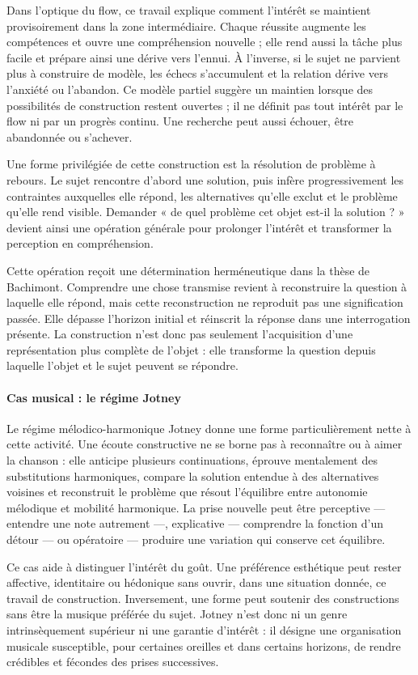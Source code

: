 \documentclass[10pt,a4paper]{article}
\begin{document}
Dans l'optique du flow, ce travail explique comment l'intérêt se maintient provisoirement dans la zone intermédiaire. Chaque réussite augmente les compétences et ouvre une compréhension nouvelle ; elle rend aussi la tâche plus facile et prépare ainsi une dérive vers l'ennui. À l'inverse, si le sujet ne parvient plus à construire de modèle, les échecs s'accumulent et la relation dérive vers l'anxiété ou l'abandon. Ce modèle partiel suggère un maintien lorsque des possibilités de construction restent ouvertes ; il ne définit pas tout intérêt par le flow ni par un progrès continu. Une recherche peut aussi échouer, être abandonnée ou s'achever.

Une forme privilégiée de cette construction est la résolution de problème à rebours. Le sujet rencontre d'abord une solution, puis infère progressivement les contraintes auxquelles elle répond, les alternatives qu'elle exclut et le problème qu'elle rend visible. Demander « de quel problème cet objet est-il la solution ? » devient ainsi une opération générale pour prolonger l'intérêt et transformer la perception en compréhension.

Cette opération reçoit une détermination herméneutique dans la thèse de Bachimont. Comprendre une chose transmise revient à reconstruire la question à laquelle elle répond, mais cette reconstruction ne reproduit pas une signification passée. Elle dépasse l'horizon initial et réinscrit la réponse dans une interrogation présente. La construction n'est donc pas seulement l'acquisition d'une représentation plus complète de l'objet : elle transforme la question depuis laquelle l'objet et le sujet peuvent se répondre.

\paragraph{Cas musical : le régime Jotney}
Le régime mélodico-harmonique Jotney donne une forme particulièrement nette à cette activité. Une écoute constructive ne se borne pas à reconnaître ou à aimer la chanson : elle anticipe plusieurs continuations, éprouve mentalement des substitutions harmoniques, compare la solution entendue à des alternatives voisines et reconstruit le problème que résout l'équilibre entre autonomie mélodique et mobilité harmonique. La prise nouvelle peut être perceptive — entendre une note autrement —, explicative — comprendre la fonction d'un détour — ou opératoire — produire une variation qui conserve cet équilibre.

Ce cas aide à distinguer l'intérêt du goût. Une préférence esthétique peut rester affective, identitaire ou hédonique sans ouvrir, dans une situation donnée, ce travail de construction. Inversement, une forme peut soutenir des constructions sans être la musique préférée du sujet. Jotney n'est donc ni un genre intrinsèquement supérieur ni une garantie d'intérêt : il désigne une organisation musicale susceptible, pour certaines oreilles et dans certains horizons, de rendre crédibles et fécondes des prises successives.
\end{document}

